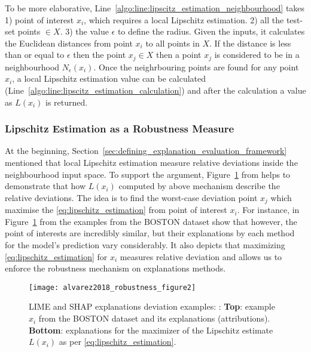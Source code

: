 \documentclass[english]{tktltiki2}
\theoremstyle{definition}
\theoremstyle{remark}
\begin{document}
To be more elaborative, Line~\ref{algo:line:lipscitz_estimation_neighbourhood}
takes 1)  point of interest $x_i$, which requires a local Lipschitz estimation. 2) all the test-set points $ \in X$. 3) the value $\epsilon$ to define the radius. Given the inputs, it calculates the Euclidean distances from point $x_i$ to all points in $X$. If the distance is less than or equal to $\epsilon$ then the point $x_j \in X$ then a point $x_j$ is considered to be in a neighbourhood $N_{\epsilon}(x_i)$. Once the neighrbouring points are found for any point $x_i$, a local Lipschitz estimation value can be calculated (Line~\ref{algo:line:lipscitz_estimation_calculation}) and after the calculation a value as $L(x_i)$ is returned.

\subsubsection{Lipschitz Estimation as a Robustness Measure}\label{sec:lipschitz_estimation_as_a_robustness_measure} %
At the beginning, Section~\ref{sec:defining_explanation_evaluation_framework} mentioned that local Lipschitz estimation measure relative deviations inside the neighbourhood input space. To support the argument, Figure~\ref{fig:alvarez2018_robustness_figure2} from \citep{alvarez2018robustness} helps to demonstrate that how $L(x_i)$ computed by above mechanism describe the relative deviations. The idea is to find the worst-case deviation point $x_j$ which maximise the \eqref{eq:lipschitz_estimation} from point of interest $x_i$. For instance, in Figure~\ref{fig:alvarez2018_robustness_figure2} from \citep{alvarez2018robustness} the examples from the BOSTON dataset show that however, the point of interests are incredibly similar, but their explanations by each method for the model’s prediction vary considerably. It also depicts that maximizing \eqref{eq:lipschitz_estimation} for $x_i$ measures relative deviation and allows us to enforce the robustness mechanism on explanations methods.
\begin{figure}[H]
	\texttt{[image: alvarez2018\_robustness\_figure2]}
	\vspace*{-10mm}
	\caption{LIME and SHAP explanations deviation examples: \citep{alvarez2018robustness}: \textbf{Top}: example $x_i$ from the BOSTON dataset and its explanations (attributions). \textbf{Bottom}: explanations for the maximizer of the Lipschitz estimate $L(x_i)$ as per \eqref{eq:lipschitz_estimation}.}
	\label{fig:alvarez2018_robustness_figure2}
\end{figure}
\end{document}
